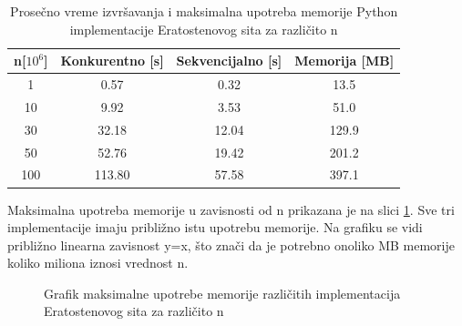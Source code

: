 \documentclass[12pt,oneside]{memoir}
\begin{document}
\begin{table}
\begin{center}
\caption{Prosečno vreme izvršavanja i maksimalna upotreba memorije Python implementacije Eratostenovog sita za različito n}
\begin{tabular}{||c||c|c|c||}
\hline
n[$10^{6}$] & Konkurentno [s]& Sekvencijalno [s] & Memorija [MB] \\ \hline
1	&0.57	&0.32&13.5\\
10	&9.92&3.53&51.0\\
30	&32.18&12.04&129.9\\
50	&52.76&19.42&201.2\\
100	&113.80&57.58&397.1\\
\hline
\end{tabular}
\label{tab:prime1}
\end{center}
\end{table}


Maksimalna upotreba memorije u zavisnosti od n prikazana je na slici \ref{fig:prime2}. Sve tri implementacije imaju približno istu upotrebu memorije. Na grafiku se vidi približno linearna zavisnost y=x, što znači da je potrebno onoliko MB memorije koliko miliona iznosi vrednost n.
\\

\begin{figure}
\begin{center}


\caption{Grafik maksimalne upotrebe memorije različitih implementacija Eratostenovog sita za različito n}
\label{fig:prime2}
\end{center}
\end{figure}

\newpage
\end{document}

